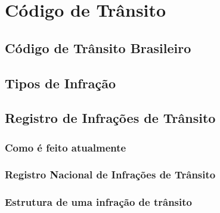 \section{Código de Trânsito}

\subsection{Código de Trânsito Brasileiro}

\subsection{Tipos de Infração}

\subsection{Registro de Infrações de Trânsito}

    \subsubsection{Como é feito atualmente}

    \subsubsection{Registro Nacional de Infrações de Trânsito}

    \subsubsection{Estrutura de uma infração de trânsito}